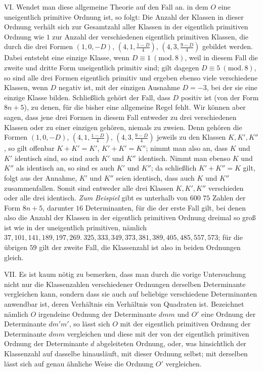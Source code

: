 VI. Wendet man diese allgemeine Theorie auf den Fall an. in dem \(O\) eine uneigentlich primitive Ordnung ist, so folgt: Die Anzahl der Klassen in dieser Ordnung verhält sich zur Gesamtzahl aller Klassen in der eigentlich primitiven Ordnung wie \(1\) zur Anzahl der verschiedenen eigentlich primitiven Klassen, die durch die drei Formen \((1,0,-D)\), \((4,1,\frac{1-D}{4})\), \((4,3,\frac{9-D}{4})\) gebildet werden. Dabei entsteht eine einzige Klasse, wenn \(D\equiv1\ (\mathrm{mod.}\,8)\), weil in diesem Fall die zweite und dritte Form uneigentlich primitiv sind; gilt dagegen \(D\equiv5\ (\mathrm{mod.}\,8)\), so sind alle drei Formen eigentlich primitiv und ergeben ebenso viele verschiedene Klassen, wenn \(D\) negativ ist, mit der einzigen Ausnahme \(D=-3\), bei der sie eine einzige Klasse bilden. Schließlich gehört der Fall, dass \(D\) positiv ist (von der Form \(8n+5\)), zu denen, für die bisher eine allgemeine Regel fehlt. Wir können aber sagen, dass jene drei Formen in diesem Fall
entweder zu drei verschiedenen Klassen oder zu einer einzigen gehören, niemals zu zweien. Denn gehören die Formen \((1,0,-D)\), \((4,1,\frac{1-D}{4})\), \((4,3,\frac{9-D}{4})\) jeweils zu den Klassen \(K,K',K''\), so gilt offenbar \(K+K'=K'\), \(K'+K'=K''\); nimmt man also an, dass \(K\) und \(K'\) identisch sind, so sind auch \(K'\) und \(K''\) identisch. Nimmt man ebenso \(K\) und \(K''\) als identisch an, so sind es auch \(K'\) und \(K''\); da schließlich \(K'+K''=K\) gilt, folgt aus der Annahme, \(K'\) und \(K''\) seien identisch, dass auch \(K\) und \(K''\) zusammenfallen. Somit sind entweder alle drei Klassen \(K,K',K''\) verschieden oder alle drei identisch. \textit{Zum Beispiel} gibt es unterhalb von \(600\) \(75\) Zahlen der Form \(8n+5\), darunter \(16\) Determinanten, für die der erste Fall gilt, bei denen also die Anzahl der Klassen in der eigentlich primitiven Ordnung dreimal so groß ist wie in der uneigentlich primitiven, nämlich \(37,\allowbreak 101,\allowbreak 141,\allowbreak 189,\allowbreak 197,\allowbreak 269.\ 325,\allowbreak 333,\allowbreak 349,\allowbreak 373,\allowbreak 381,\allowbreak 389,\allowbreak 405,\allowbreak 485,\allowbreak 557,\allowbreak 573\); für die übrigen \(59\) gilt der zweite Fall, die Klassenzahl ist also in beiden Ordnungen gleich.

VII. Es ist kaum nötig zu bemerken, dass man durch die vorige Untersuchung nicht nur die Klassenzahlen verschiedener Ordnungen derselben Determinante vergleichen kann, sondern dass sie auch auf beliebige verschiedene Determinanten anwendbar ist, deren Verhältnis ein Verhältnis von Quadraten ist. Bezeichnet nämlich \(O\) irgendeine Ordnung der Determinante \(dmm\) und \(O'\) eine Ordnung der Determinante \(dm'm'\), so lässt sich \(O\) mit der eigentlich primitiven Ordnung der Determinante \(dmm\) vergleichen und diese mit der von der eigentlich primitiven Ordnung der Determinante \(d\) abgeleiteten Ordnung, oder, was hinsichtlich der Klassenzahl auf dasselbe hinausläuft, mit dieser Ordnung selbst; mit derselben lässt sich auf genau ähnliche Weise die Ordnung \(O'\) vergleichen.
